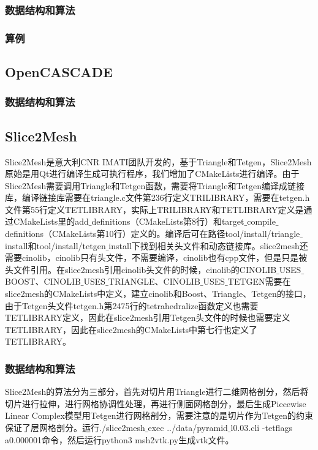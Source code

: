 \subsubsection{数据结构和算法}

\subsubsection{算例}

\subsection{OpenCASCADE}

\subsubsection{数据结构和算法}

\subsection{Slice2Mesh}

Slice2Mesh是意大利CNR IMATI团队开发的，基于Triangle和Tetgen，Slice2Mesh原始是用Qt进行编译生成可执行程序，我们增加了CMakeLists进行编译。由于Slice2Mesh需要调用Triangle和Tetgen函数，需要将Triangle和Tetgen编译成链接库，编译链接库需要在triangle.c文件第236行定义TRILIBRARY，需要在tetgen.h文件第55行定义TETLIBRARY，实际上TRILIBRARY和TETLIBRARY定义是通过CMakeLists里的add$\_$definitions（CMakeLists第8行）和target$\_$compile$\_$definitions（CMakeLists第10行）定义的。编译后可在路径tool/install/triangle$\_$install和tool/install/tetgen$\_$install下找到相关头文件和动态链接库。slice2mesh还需要cinolib，cinolib只有头文件，不需要编译，cinolib也有cpp文件，但是只是被头文件引用。在slice2mesh引用cinolib头文件的时候，cinolib的CINOLIB$\_$USES$\_$BOOST、CINOLIB$\_$USES$\_$TRIANGLE、CINOLIB$\_$USES$\_$TETGEN需要在slice2mesh的CMakeLists中定义，建立cinolib和Boost、Triangle、Tetgen的接口，由于Tetgen头文件tetgen.h第2475行的tetrahedralize函数定义也需要TETLIBRARY定义，因此在slice2mesh引用Tetgen头文件的时候也需要定义TETLIBRARY，因此在slice2mesh的CMakeLists中第七行也定义了TETLIBRARY。

\subsubsection{数据结构和算法}

Slice2Mesh的算法分为三部分，首先对切片用Triangle进行二维网格剖分，然后将切片进行拉伸，进行网格协调性处理，再进行侧面网格剖分，最后生成Piecewise Linear Complex模型用Tetgen进行网格剖分，需要注意的是切片作为Tetgen的约束保证了层网格剖分。运行./slice2mesh$\_$exec ../data/pyramid$\_$l0.03.cli -tetflags a0.000001命令，然后运行python3 msh2vtk.py生成vtk文件。

